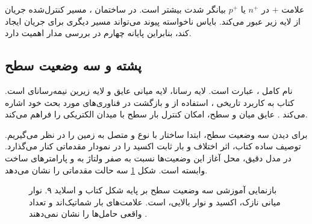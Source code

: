 علامت \(+\) در \(n^+\) یا \(p^+\) بیانگر شدت بیشتر  است.
در ساختمان ، مسیر کنترل‌شده جریان از لایه زیر  عبور می‌کند.
بایاس ناخواسته پیوند  می‌تواند مسیر دیگری برای جریان ایجاد کند، بنابراین
پایانه چهارم در بررسی مدار اهمیت دارد.

\subsection{پشته  و سه وضعیت سطح }
نام کامل ، عبارت  است.
لایه  رسانا، لایه میانی  عایق و لایه زیرین نیمه‌رسانای
 است. کتاب به کاربرد تاریخی ، استفاده از
 و بازگشت  در فناوری‌های مورد بحث خود اشاره می‌کند
\cite[صفحه ۶۱]{weste}. عایق میان  و سطح، امکان کنترل بار سطح با میدان
الکتریکی را فراهم می‌کند.

برای دیدن سه وضعیت سطح، ابتدا ساختار  با  نوع
 و متصل به زمین را در نظر می‌گیریم. توصیف ساده کتاب، اثر اختلاف
 و بار ثابت اکسید را در نمودار مقدماتی کنار می‌گذارد.
در مدل دقیق، محل آغاز این وضعیت‌ها نسبت به صفر ولتاژ به 
و پارامترهای ساخت وابسته است. شکل \ref{fig:mos-surface} سه حالت مقدماتی را نشان می‌دهد.

\begin{figure}[ht]
\centering
\begin{latin}
\end{latin}
\caption{بازنمایی آموزشی سه وضعیت سطح  بر پایه شکل
 کتاب و اسلاید ۹. نوار میانی نازک، اکسید و نوار بالایی،  است.
علامت‌های بار شماتیک‌اند و تعداد واقعی حامل‌ها را نشان نمی‌دهند \cite{weste,mos}.}
\label{fig:mos-surface}
\end{figure}

